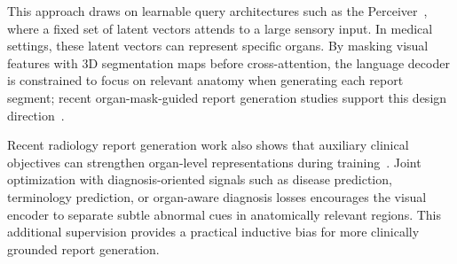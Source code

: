 This approach draws on learnable query architectures such as the Perceiver~\cite{jaegle2021perceiver}, where a fixed set of latent vectors attends to a large sensory input. In medical settings, these latent vectors can represent specific organs. By masking visual features with 3D segmentation maps before cross-attention, the language decoder is constrained to focus on relevant anatomy when generating each report segment; recent organ-mask-guided report generation studies support this design direction~\cite{gu2024comg,li2024organaware}.

Recent radiology report generation work also shows that auxiliary clinical objectives can strengthen organ-level representations during training~\cite{su2024tgmt,li2024organaware}. Joint optimization with diagnosis-oriented signals such as disease prediction, terminology prediction, or organ-aware diagnosis losses encourages the visual encoder to separate subtle abnormal cues in anatomically relevant regions. This additional supervision provides a practical inductive bias for more clinically grounded report generation.
